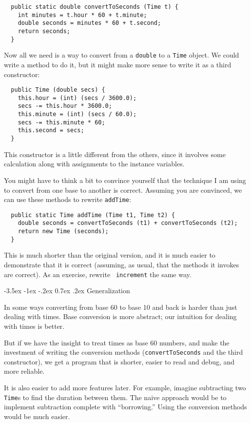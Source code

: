 \documentclass{book}
\makeatletter
\renewcommand{\section}{\@startsection 
    {section} {1} {0mm}%
    {-3.5ex \@plus -1ex \@minus -.2ex}%
    {0.7ex \@plus.2ex}%
    {\normalfont\Large\bfseries}}
\makeatother
\begin{document}
\begin{verbatim}
  public static double convertToSeconds (Time t) {
    int minutes = t.hour * 60 + t.minute;
    double seconds = minutes * 60 + t.second;
    return seconds;
  }
\end{verbatim}
%
Now all we need is a way to convert from a {\tt double}
to a {\tt Time} object.  We could write a method to
do it, but it might make more sense to write it as a third
constructor:

\begin{verbatim}
  public Time (double secs) {
    this.hour = (int) (secs / 3600.0);
    secs -= this.hour * 3600.0;
    this.minute = (int) (secs / 60.0);
    secs -= this.minute * 60;
    this.second = secs;
  }
\end{verbatim}
%
This constructor is a little different from the others, since
it involves some calculation along with assignments to the
instance variables.

You might have to think a bit to convince yourself that the technique
I am using to convert from one base to another is correct.  Assuming
you are convinced, we can use these methods to rewrite {\tt addTime}:

\begin{verbatim}
  public static Time addTime (Time t1, Time t2) {
    double seconds = convertToSeconds (t1) + convertToSeconds (t2);
    return new Time (seconds);
  }
\end{verbatim}
%
This is much shorter than the original version, and it is much easier
to demonstrate that it is correct (assuming, as usual, that the
methods it invokes are correct).  As an exercise, rewrite {\tt
increment} the same way.


\section{Generalization}

In some ways converting from base 60 to base 10 and back is
harder than just dealing with times.  Base conversion is more
abstract; our intuition for dealing with times is better.

But if we have the insight to treat times as base 60 numbers,
and make the investment of writing the conversion methods
({\tt convertToSeconds} and the third constructor), we get
a program that is shorter, easier to read and debug, and more
reliable.

It is also easier to add more features later.  For example, imagine
subtracting two {\tt Time}s to find the duration between them.  The
naive approach would be to implement subtraction complete with
``borrowing.''  Using the conversion methods would be much easier.
\end{document}
